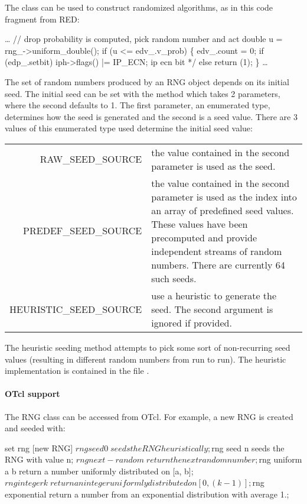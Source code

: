 The  class can be used to construct randomized algorithms,
as in this code fragment from RED:
\begin{program}
        \ldots
        // {\cf drop probability is computed, pick random number and act}
        double u = rng_->uniform_double();
        if (u <= edv_.v_prob) \{
                edv_.count = 0;
                if (edp_.setbit) 
                        iph->flags() |= IP_ECN; \* ip ecn bit */
                else
                        return (1);
        \}
        \ldots
\end{program}
The set of random numbers produced by an RNG object depends on its
initial seed.  The initial seed can be set with the  method
which takes 2 parameters, where the second
defaults to 1.  The first parameter, an enumerated type,
determines how
the seed is generated and the second is a seed value.  There are 3
values of this enumerated type used determine the initial seed value:

\begin{tabularx}{\linewidth}{rX}
RAW\_SEED\_SOURCE &  the value contained in the second parameter is used
			as the seed.\\
PREDEF\_SEED\_SOURCE &  the value contained in the second parameter is
	used as the index into an array of predefined seed values.  These
	values have been precomputed and provide independent streams of random
	numbers.  There are currently 64 such seeds.\\
HEURISTIC\_SEED\_SOURCE  & use a heuristic to generate the seed.
	The second argument is ignored if provided.\\
\end{tabularx}

The heuristic seeding method
attempts to pick some sort of non-recurring seed values (resulting
in different random numbers from run to run).  The heuristic implementation
is contained in the file .

\paragraph{OTcl support}
The RNG class can be accessed from OTcl.  For example, a new RNG is
created and seeded with:

\begin{program}
set rng [new RNG]
$rng seed 0 \; seeds the RNG heuristically;
$rng seed n \; seeds the RNG with value n;
$rng next-random \;  return the next random number;
$rng uniform a b \; return a number uniformly distributed on [a, b];
$rng integer k \; return an integer uniformly distributed on [0, (k-1)];
$rng exponential \; return a number from an exponential distribution with average 1.;
\end{program}

